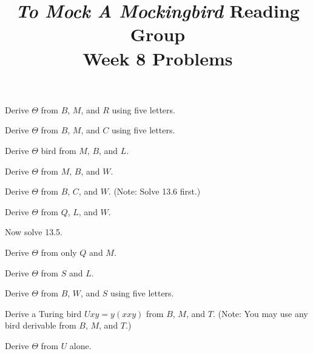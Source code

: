 \documentclass[12pt, letterpaper]{article}
\title{\emph{To Mock A Mockingbird} Reading Group\\Week 8 Problems}
\begin{document}
\maketitle
\setcounter{section}{13}

\begin{prob}{13.1}   
Derive $\Theta$ from $B$, $M$, and $R$ using five letters.
\end{prob}

\begin{prob}{13.2}   
Derive $\Theta$ from $B$, $M$, and $C$ using five letters.
\end{prob}

\begin{prob}{13.3}   
Derive $\Theta$ bird from $M$, $B$, and $L$.
\end{prob}

\begin{prob}{13.4}   
Derive $\Theta$ from $M$, $B$, and $W$.
\end{prob}

\begin{prob}{13.5}   
Derive $\Theta$ from $B$, $C$, and $W$. (Note: Solve 13.6 first.)
\end{prob}

\begin{prob}{13.6}   
Derive $\Theta$ from $Q$, $L$, and $W$.
\end{prob}

\begin{prob}{13.7}   
Now solve 13.5.
\end{prob}

\begin{prob}{13.8}   
Derive $\Theta$ from only $Q$ and $M$.
\end{prob}

\begin{prob}{13.9}   
Derive $\Theta$ from $S$ and $L$.
\end{prob}

\begin{prob}{13.10}  
Derive $\Theta$ from $B$, $W$, and $S$ using five letters.
\end{prob}

\begin{prob}{13.11}  
Derive a Turing bird $Uxy = y(xxy)$ from $B$, $M$, and $T$. (Note: You may use any bird derivable from $B$, $M$, and $T$.)
\end{prob}

\begin{prob}{13.12}  
Derive $\Theta$ from $U$ alone.
\end{prob}
\end{document}
